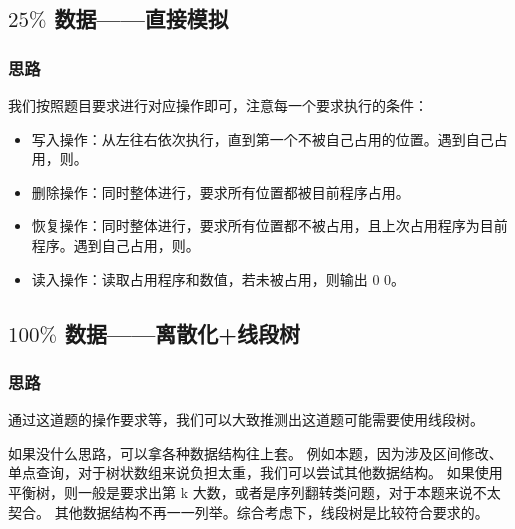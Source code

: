 
% 

\subsection{\texorpdfstring{$25\%$}{25\%} 数据——直接模拟}

\subsubsection{思路}

我们按照题目要求进行对应操作即可，注意每一个要求执行的条件：

\begin{itemize}
  \item 写入操作：从左往右依次执行，直到第一个不被自己占用的位置。{}遇到自己占用，则{}。
  \item 删除操作：同时整体进行，要求所有位置都被目前程序占用。{}
  \item 恢复操作：同时整体进行，要求所有位置都不被占用，且上次占用程序为目前程序。{}遇到自己占用，则{}。
  \item 读入操作：读取占用程序和数值，若未被占用，则输出 0 0。
\end{itemize}

\subsection{\texorpdfstring{$100\%$}{100\%} 数据——离散化+线段树}

\subsubsection{思路}

通过这道题的操作要求等，我们可以大致推测出这道题可能需要使用线段树。

\begin{note}
  如果没什么思路，可以拿各种数据结构往上套。
  例如本题，因为涉及区间修改、单点查询，对于树状数组来说负担太重，我们可以尝试其他数据结构。
  如果使用平衡树，则一般是要求出第 k 大数，或者是序列翻转类问题，对于本题来说不太契合。
  其他数据结构不再一一列举。综合考虑下，线段树是比较符合要求的。
\end{note}

